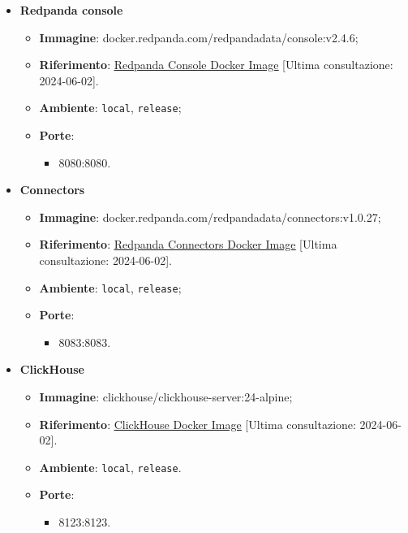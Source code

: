 \begin{itemize}
	\item \textbf{Redpanda console}
	      \begin{itemize}
		      \item \textbf{Immagine}: docker.redpanda.com/redpandadata/console:v2.4.6;
		      \item \textbf{Riferimento}: \underline{\href{https://hub.docker.com/r/redpandadata/redpanda}{Redpanda Console Docker Image}} [Ultima consultazione: 2024-06-02].
		      \item \textbf{Ambiente}: \texttt{local}, \texttt{release};
		      \item \textbf{Porte}:
		            \begin{itemize}
			            \item 8080:8080.
		            \end{itemize}
	      \end{itemize}

	\item \textbf{Connectors}
	      \begin{itemize}
		      \item \textbf{Immagine}: docker.redpanda.com/redpandadata/connectors:v1.0.27;
		      \item \textbf{Riferimento}: \underline{\href{https://hub.docker.com/r/redpandadata/connectors}{Redpanda Connectors Docker Image}} [Ultima consultazione: 2024-06-02].
		      \item \textbf{Ambiente}: \texttt{local}, \texttt{release};
		      \item \textbf{Porte}:
		            \begin{itemize}
			            \item 8083:8083.
		            \end{itemize}
	      \end{itemize}

	\item \textbf{ClickHouse}
	      \begin{itemize}
		      \item \textbf{Immagine}: clickhouse/clickhouse-server:24-alpine;
		      \item \textbf{Riferimento}: \underline{\href{https://hub.docker.com/r/clickhouse/clickhouse-server}{ClickHouse Docker Image}} [Ultima consultazione: 2024-06-02].
		      \item \textbf{Ambiente}: \texttt{local}, \texttt{release}.
		      \item \textbf{Porte}:
		            \begin{itemize}
			            \item 8123:8123.
		            \end{itemize}
	      \end{itemize}


\end{itemize}
